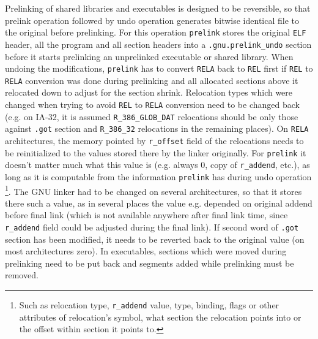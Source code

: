 \documentclass[twoside]{article}
\def\tts#1{\texttt{\small #1}}
\begin{document}
Prelinking of shared libraries and executables is designed to be reversible,
so that prelink operation followed by undo operation generates bitwise
identical file to the original before prelinking.  For this operation
\tts{prelink} stores the original \tts{ELF} header, all the program and
all section headers into a \tts{.gnu.prelink\_undo} section before it starts prelinking
an unprelinked executable or shared library.  When undoing the modifications,
\tts{prelink} has to convert \tts{RELA} back to \tts{REL} first if \tts{REL}
to \tts{RELA} conversion was done during prelinking and all allocated
sections above it relocated down to adjust for the section shrink.
Relocation types which were changed when trying to avoid \tts{REL} to
\tts{RELA} conversion need to be changed back (e.g. on IA-32, it is
assumed \tts{R\_386\_GLOB\_DAT} relocations should be only those
against \tts{.got} section and \tts{R\_386\_32} relocations in the
remaining places).  On \tts{RELA} architectures, the memory pointed
by \tts{r\_offset} field of the relocations needs to be reinitialized
to the values stored there by the linker originally.
For \tts{prelink} it doesn't matter much what this value is (e.g.
always 0, copy of \tts{r\_addend}, etc.), as long as it is computable
from the information \tts{prelink} has during undo operation
\footnote{Such as relocation type, \tts{r\_addend} value,
type, binding, flags or other attributes of relocation's symbol,
what section the relocation points into or the offset within
section it points to.}.  The GNU linker had to be changed on several
architectures, so that it stores there such a value, as in several places
the value e.g. depended on original addend before final link (which is
not available anywhere after final link time, since \tts{r\_addend}
field could be adjusted during the final link).
If second word of \tts{.got} section has been modified, it needs
to be reverted back to the original value (on most architectures zero).
In executables, sections which were moved during prelinking need to be
put back and segments added while prelinking must be removed.
\end{document}
